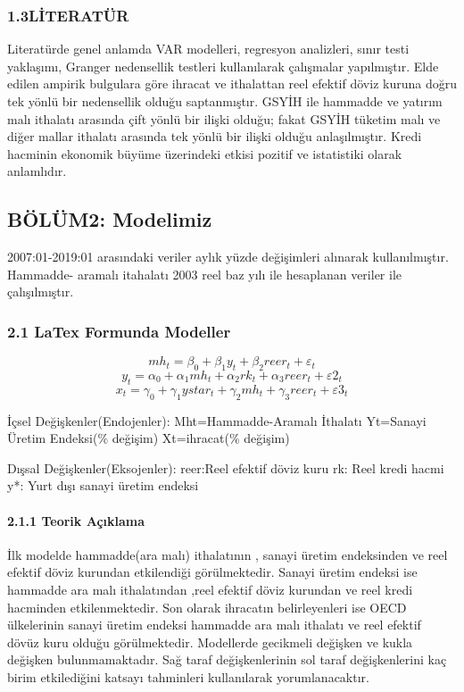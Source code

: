 \documentclass[]{article}
\let\oldparagraph\paragraph
\renewcommand{\paragraph}[1]{\oldparagraph{#1}\mbox{}}
\begin{document}
\subsubsection{1.3LİTERATÜR}\label{literatur}

Literatürde genel anlamda VAR modelleri, regresyon analizleri, sınır
testi yaklaşımı, Granger nedensellik testleri kullanılarak çalışmalar
yapılmıştır. Elde edilen ampirik bulgulara göre ihracat ve ithalattan
reel efektif döviz kuruna doğru tek yönlü bir nedensellik olduğu
saptanmıştır. GSYİH ile hammadde ve yatırım malı ithalatı arasında çift
yönlü bir ilişki olduğu; fakat GSYİH tüketim malı ve diğer mallar
ithalatı arasında tek yönlü bir ilişki olduğu anlaşılmıştır. Kredi
hacminin ekonomik büyüme üzerindeki etkisi pozitif ve istatistiki olarak
anlamlıdır.

\subsection{BÖLÜM2: Modelimiz}\label{bolum2-modelimiz}

2007:01-2019:01 arasındaki veriler aylık yüzde değişimleri alınarak
kullanılmıştır. Hammadde- aramalı itahalatı 2003 reel baz yılı ile
hesaplanan veriler ile çalışılmıştır.

\subsubsection{2.1 LaTex Formunda
Modeller}\label{latex-formunda-modeller}

\[
mh_t = \beta_0 + \beta_1 y_t + \beta_2 reer_t + \varepsilon_t
\] \[
y_t = \alpha_0 + \alpha_1 mh_t + \alpha_2 rk_t + \alpha_3 reer_t + \varepsilon2_t
\] \[
x_t = \gamma_0 + \gamma_1 ystar_t + \gamma_2 mh_t + \gamma_3 reer_t + \varepsilon3_t
\]

İçsel Değişkenler(Endojenler): Mht=Hammadde-Aramalı İthalatı Yt=Sanayi
Üretim Endeksi(\% değişim) Xt=ihracat(\% değişim)

Dışsal Değişkenler(Eksojenler): reer:Reel efektif döviz kuru rk: Reel
kredi hacmi y*: Yurt dışı sanayi üretim endeksi

\paragraph{2.1.1 Teorik Açıklama}\label{teorik-acklama}

İlk modelde hammadde(ara malı) ithalatının , sanayi üretim endeksinden
ve reel efektif döviz kurundan etkilendiği görülmektedir. Sanayi üretim
endeksi ise hammadde ara malı ithalatından ,reel efektif döviz kurundan
ve reel kredi hacminden etkilenmektedir. Son olarak ihracatın
belirleyenleri ise OECD ülkelerinin sanayi üretim endeksi hammadde ara
malı ithalatı ve reel efektif dövüz kuru olduğu görülmektedir.
Modellerde gecikmeli değişken ve kukla değişken bulunmamaktadır. Sağ
taraf değişkenlerinin sol taraf değişkenlerini kaç birim etkilediğini
katsayı tahminleri kullanılarak yorumlanacaktır.
\end{document}
